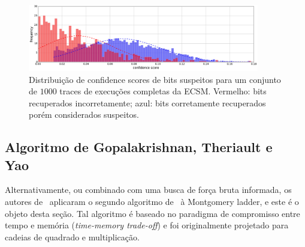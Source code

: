 \begin{figure}[h!tb]
	\centering   %
	\includegraphics[width=0.9\textwidth]{figures/SAC_2016__pointer_cswap_attack__hist-conf-all-traces__n_trset_40.png}
	\caption{
	Distribuição de confidence scores de bits suspeitos para um conjunto de $1000$ traces de execuções completas da ECSM. Vermelho: bits recuperados incorretamente; azul: bits corretamente recuperados porém considerados suspeitos.
	}
	\vspace{.5mm}
	\label{fig:hist-conf-all-traces__n_trset_40}
\end{figure}

\subsection{Algoritmo de Gopalakrishnan, Theriault e Yao~\cite{GopalakrishnanTheriaultYao07}} %
\label{sec:alg-keyrecv-Gopalakrishnan}

Alternativamente, ou combinado com uma busca de força bruta informada, os autores de~\cite{Nascimento2016_SAC} aplicaram o segundo algoritmo de~\cite{Gopalakrishnan2007} à Montgomery ladder, e este é o objeto desta seção. Tal algoritmo é baseado no paradigma de compromisso entre tempo e memória (\textit{time-memory trade-off}) e foi originalmente projetado para cadeias de quadrado e multiplicação.


